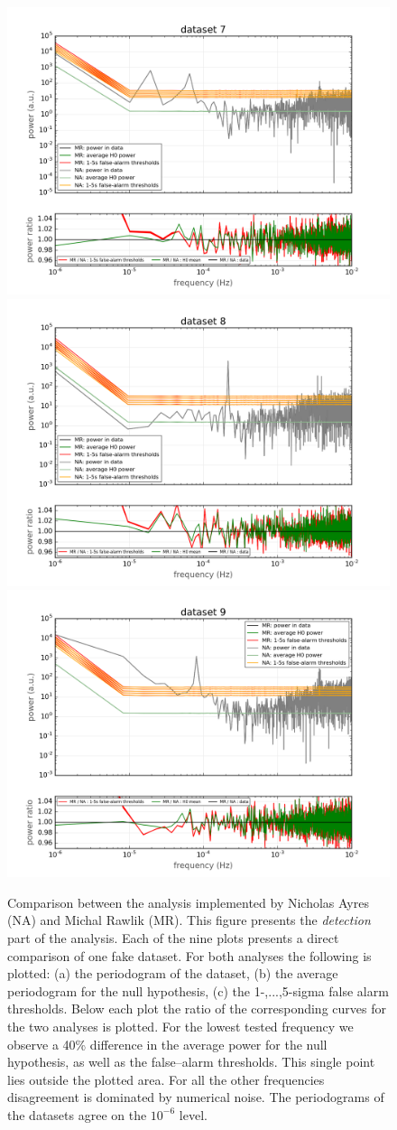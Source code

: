 \begin{figure}[ptb]
  \centering \includegraphics[width=0.32\linewidth]{gfx/axions/comparison/comparison_detection_dataset7.png}
  \centering \includegraphics[width=0.32\linewidth]{gfx/axions/comparison/comparison_detection_dataset8.png}
  \centering \includegraphics[width=0.32\linewidth]{gfx/axions/comparison/comparison_detection_dataset9.png}
  \caption{Comparison between the analysis implemented by Nicholas Ayres (NA) and Michal  Rawlik (MR). This figure presents the \emph{detection} part of the analysis. Each of the nine plots presents a direct comparison of one fake dataset. For both analyses the following is plotted: (a) the periodogram of the dataset, (b) the average periodogram for the null hypothesis, (c) the 1-,...,5-sigma false alarm thresholds. Below each plot the ratio of the corresponding curves for the two analyses is plotted. For the lowest tested frequency we observe a 40\% difference in the average power for the null hypothesis, as well as the false--alarm thresholds. This single point lies outside the plotted area. For all the other frequencies disagreement is dominated by numerical noise. The periodograms of the datasets agree on the $10^{-6}$ level.}
  \label{fig:comparison_detection}
\end{figure}

